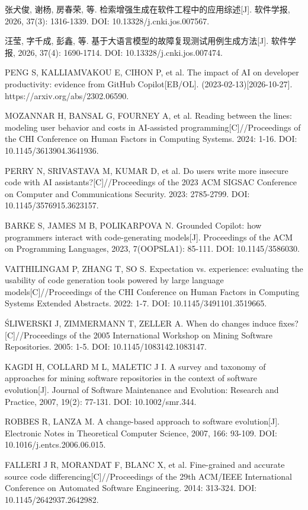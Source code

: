 {\begin{tjreflist}
\item 张犬俊, 谢杨, 房春荣, 等. 检索增强生成在软件工程中的应用综述[J]. 软件学报, 2026, 37(3): 1316-1339. DOI: 10.13328/j.cnki.jos.007567.
\item 汪莹, 字千成, 彭鑫, 等. 基于大语言模型的故障复现测试用例生成方法[J]. 软件学报, 2026, 37(4): 1690-1714. DOI: 10.13328/j.cnki.jos.007474.
\item PENG S, KALLIAMVAKOU E, CIHON P, et al. The impact of AI on developer productivity: evidence from GitHub Copilot[EB/OL]. (2023-02-13)[2026-10-27]. https://arxiv.org/abs/2302.06590.
\item MOZANNAR H, BANSAL G, FOURNEY A, et al. Reading between the lines: modeling user behavior and costs in AI-assisted programming[C]//Proceedings of the CHI Conference on Human Factors in Computing Systems. 2024: 1-16. DOI: 10.1145/3613904.3641936.
\item PERRY N, SRIVASTAVA M, KUMAR D, et al. Do users write more insecure code with AI assistants?[C]//Proceedings of the 2023 ACM SIGSAC Conference on Computer and Communications Security. 2023: 2785-2799. DOI: 10.1145/3576915.3623157.
\item BARKE S, JAMES M B, POLIKARPOVA N. Grounded Copilot: how programmers interact with code-generating models[J]. Proceedings of the ACM on Programming Languages, 2023, 7(OOPSLA1): 85-111. DOI: 10.1145/3586030.
\item VAITHILINGAM P, ZHANG T, SO S. Expectation vs. experience: evaluating the usability of code generation tools powered by large language models[C]//Proceedings of the CHI Conference on Human Factors in Computing Systems Extended Abstracts. 2022: 1-7. DOI: 10.1145/3491101.3519665.
\item ŚLIWERSKI J, ZIMMERMANN T, ZELLER A. When do changes induce fixes?[C]//Proceedings of the 2005 International Workshop on Mining Software Repositories. 2005: 1-5. DOI: 10.1145/1083142.1083147.
\item KAGDI H, COLLARD M L, MALETIC J I. A survey and taxonomy of approaches for mining software repositories in the context of software evolution[J]. Journal of Software Maintenance and Evolution: Research and Practice, 2007, 19(2): 77-131. DOI: 10.1002/smr.344.
\item ROBBES R, LANZA M. A change-based approach to software evolution[J]. Electronic Notes in Theoretical Computer Science, 2007, 166: 93-109. DOI: 10.1016/j.entcs.2006.06.015.
\item FALLERI J R, MORANDAT F, BLANC X, et al. Fine-grained and accurate source code differencing[C]//Proceedings of the 29th ACM/IEEE International Conference on Automated Software Engineering. 2014: 313-324. DOI: 10.1145/2642937.2642982.

\end{tjreflist}}
